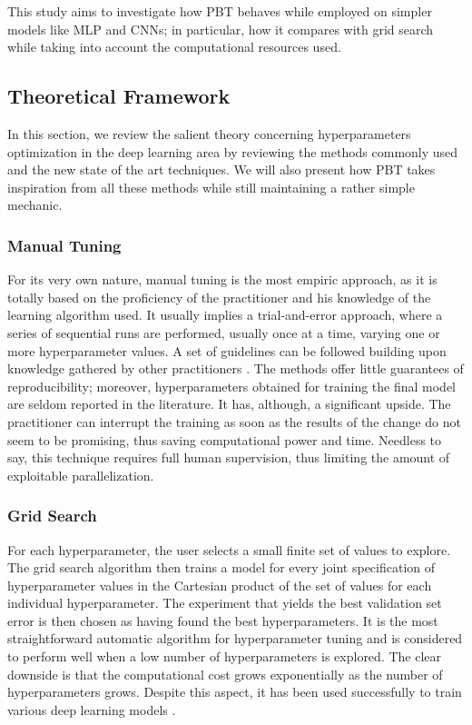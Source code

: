 \documentclass{article}
\begin{document}
	This study aims to investigate how PBT behaves while employed on simpler models like MLP and CNNs; in particular, how it compares with grid search while taking into account the computational resources used.
	
	\subsection{Theoretical Framework}
	\label{sec:th_framework}
	In this section, we review the salient theory concerning hyperparameters optimization in the deep learning area by reviewing the methods commonly used and the new state of the art techniques. We will also present how PBT takes inspiration from all these methods while still maintaining a rather simple mechanic.
	
	\subsubsection*{Manual Tuning}
	For its very own nature, manual tuning is the most empiric approach, as it is totally based on the proficiency of the practitioner and his knowledge of the learning algorithm used. It usually implies a trial-and-error approach, where a series of sequential runs are performed, usually once at a time, varying one or more hyperparameter values. A set of guidelines can be followed building upon knowledge gathered by other practitioners \cite{Goodfellow-et-al-2016}\cite{DBLP:series/lncs/7700}\cite{LeCun:1998:EB:645754.668382}.
	The methods offer little guarantees of reproducibility; moreover, hyperparameters obtained for training the final model are seldom reported in the literature. 
	It has, although, a significant upside. The practitioner can interrupt the training as soon as the results of the change do not seem to be promising, thus saving computational power and time. Needless to say, this technique requires full human supervision, thus limiting the amount of exploitable parallelization. 
	
	\subsubsection*{Grid Search}
	For each hyperparameter, the user selects a small finite set of values to explore. The grid search algorithm then trains a model for every joint specification of hyperparameter values in the Cartesian product of the set of values for each individual hyperparameter. The experiment that yields the best validation set error is then chosen as having found the best hyperparameters.
	It is the most straightforward automatic algorithm for hyperparameter tuning and is considered to perform well when a low number of hyperparameters is explored\cite{Bergstra:2012:RSH:2188385.2188395}. The clear downside is that the computational cost grows exponentially as the number of hyperparameters grows.
	Despite this aspect, it has been used successfully to train various deep learning models \cite{Larochelle:2007:EED:1273496.1273556}\cite{He2016DeepRL}.
	
\end{document}
